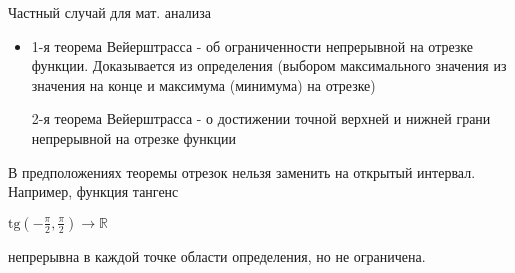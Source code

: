 Частный случай для мат. анализа

\begin{itemize}
\item 
1-я теорема Вейерштрасса - об ограниченности непрерывной на отрезке функции.
Доказывается из определения (выбором максимального значения 
из значения на конце и максимума (минимума) на отрезке)

2-я теорема Вейерштрасса - о достижении точной верхней и нижней грани непрерывной на отрезке функции

\end{itemize}
В предположениях теоремы отрезок нельзя заменить на открытый интервал. Например, функция тангенс

$ \mathrm{tg} \left( -\frac{\pi}{2} , \frac{\pi}{2} \right) \to \mathbb{R} $

непрерывна в каждой точке области определения, но не ограничена.
